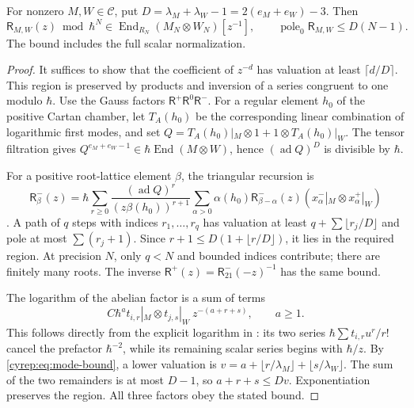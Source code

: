 \begin{theorem}\label{cyrep:thm:full-pole-bound}
For nonzero \(M,W\in\mathcal C\), put
\(D=\lambda_M+\lambda_W-1=2(e_M+e_W)-3\).
Then
\[
 \mathsf R_{M,W}(z)\bmod\hbar^N
 \in\operatorname{End}_{R_N}(M_N\otimes W_N)[z^{-1}],
 \qquad \operatorname{pole}_0\mathsf R_{M,W}\leq D(N-1).
\]
The bound includes the full scalar normalization.
\end{theorem}

\begin{proof}
It suffices to show that the coefficient of \(z^{-d}\) has valuation
at least \(\lceil d/D\rceil\). This region is preserved by products
and inversion of a series congruent to one modulo \(\hbar\).
Use the Gauss factors \(\mathsf R^+\mathsf R^0\mathsf R^-\).
For a regular element \(h_0\) of the positive Cartan chamber,
let \(T_A(h_0)\) be the corresponding linear combination of
logarithmic first modes, and set
\(Q=T_A(h_0)|_M\otimes1+1\otimes T_A(h_0)|_W\).
The tensor filtration gives
\(Q^{e_M+e_W-1}\in\hbar\operatorname{End}(M\otimes W)\),
hence \((\operatorname{ad}Q)^D\) is divisible by \(\hbar\).

For a positive root-lattice element \(\beta\), the triangular
recursion is
\[
 \mathsf R^-_\beta(z)=\hbar\sum_{r\geq0}
 \frac{(\operatorname{ad}Q)^r}{(z\beta(h_0))^{r+1}}
 \sum_{\alpha>0}\alpha(h_0)\mathsf R^-_{\beta-\alpha}(z)
                (x^-_\alpha|_M\otimes x^+_\alpha|_W)
\]
\cite[\S4.2]{GautamToledanoLaredoWendlandt2021}.
A path of \(q\) steps with indices \(r_1,\ldots,r_q\) has valuation
at least \(q+\sum\lfloor r_j/D\rfloor\) and pole at most
\(\sum(r_j+1)\). Since
\(r+1\leq D(1+\lfloor r/D\rfloor)\), it lies in the required
region. At precision \(N\), only \(q<N\) and bounded indices
contribute; there are finitely many roots. The inverse
\(\mathsf R^+(z)=\mathsf R^-_{21}(-z)^{-1}\) has the same bound.

The logarithm of the abelian factor is a sum of terms
\[
 C\hbar^a t_{i,r}|_M\otimes t_{j,s}|_W\ z^{-(a+r+s)},
                       \qquad a\geq1.
\]
This follows directly from the explicit logarithm in
\cite[equation (6.7)]{GautamToledanoLaredoWendlandt2021}:
its two series \(\hbar\sum t_{i,r}u^r/r!\) cancel the prefactor
\(\hbar^{-2}\), while its remaining scalar series begins with
\(\hbar/z\). By \eqref{cyrep:eq:mode-bound}, a lower valuation is
\(v=a+\lfloor r/\lambda_M\rfloor+\lfloor s/\lambda_W\rfloor\).
The sum of the two remainders is at most \(D-1\), so
\(a+r+s\leq Dv\). Exponentiation preserves the region.
All three factors obey the stated bound.
\end{proof}

